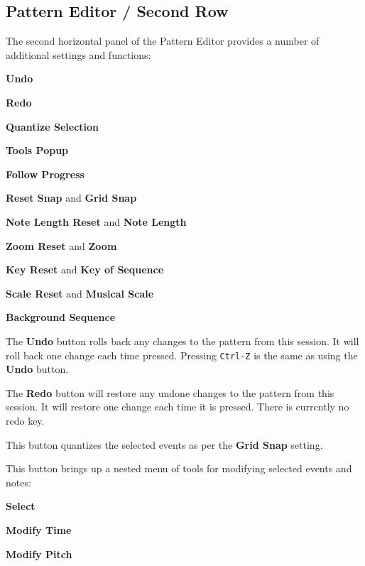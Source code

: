\subsection{Pattern Editor / Second Row}
\label{subsec:pattern_editor_second_row}

   The second horizontal panel of the Pattern Editor provides a number
   of additional settings and functions:

   \begin{enumber}
      \item \textbf{Undo}
      \item \textbf{Redo}
      \item \textbf{Quantize Selection}
      \item \textbf{Tools Popup}
      \item \textbf{Follow Progress}
      \item \textbf{Reset Snap} and \textbf{Grid Snap}
      \item \textbf{Note Length Reset} and \textbf{Note Length}
      \item \textbf{Zoom Reset} and \textbf{Zoom}
      \item \textbf{Key Reset} and \textbf{Key of Sequence}
      \item \textbf{Scale Reset} and \textbf{Musical Scale}
      \item \textbf{Background Sequence}
   \end{enumber}

   \setcounter{ItemCounter}{0}      %

   The \textbf{Undo} button rolls back any changes to the pattern from this
   session.  It will roll back one change each time pressed.
   Pressing \texttt{Ctrl-Z} is the same as using the \textbf{Undo} button.

   The \textbf{Redo} button will restore any undone changes to the pattern from
   this session.
   It will restore one change each time it is pressed.
   There is currently no redo key.

   This button quantizes the selected events as per
   the \textbf{Grid Snap} setting.

   This button brings up a nested menu of tools for modifying selected
   events and notes:

   \begin{enumber}
      \item \textbf{Select}
      \item \textbf{Modify Time}
      \item \textbf{Modify Pitch}
   \end{enumber}

